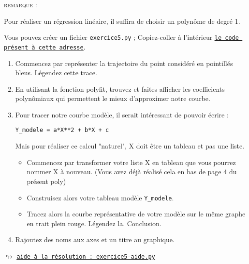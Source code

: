 \documentclass[11pt]{article}
\begin{document}
\medskip

\textsc{remarque : }

Pour réaliser un régression linéaire, il suffira de choisir un polynôme de degré 1.



\medskip


Vous pouvez créer un fichier \texttt{exercice5.py} ; Copiez-coller à l'intérieur \href{https://github.com/formationPythonPC-Juin/aides-formation/blob/master/exercice5-aide.py}{\underline{\texttt{le code présent à cette adresse}}}. 








\begin{enumerate}
\item Commencez par représenter la trajectoire du point considéré en pointillés bleus. Légendez cette trace.
\item En utilisant la fonction polyfit, trouvez et faites afficher les coefficients polynômiaux qui permettent le mieux d'approximer notre courbe.
\item Pour tracer notre courbe modèle, il serait intéressant de pouvoir écrire : 

\begin{center}
\texttt{Y\_modele = a*X**2 + b*X + c}                                     \end{center}
Mais pour réaliser ce calcul "naturel", X doit être un tableau et pas une liste. 

\begin{itemize}
 \item Commencez par transformer votre liste X en tableau que vous pourrez nommer X à nouveau. (Vous avez déjà réalisé cela en bas de page 4 du présent poly)
 \item Construisez alors votre tableau modèle \texttt{Y\_modele}.
 \item Tracez alors la courbe représentative de votre modèle sur le même graphe en trait plein rouge. Légendez la. Conclusion.
\end{itemize}
 \item Rajoutez des noms aux axes et un titre au graphique.



\end{enumerate}
 
 
 
 
 


\begin{center}
 $\looparrowright$ \href{https://github.com/formationPythonPC-Juin/aides-formation/blob/master/exercice5-aide.py}{\underline{\texttt{aide à la résolution : exercice5-aide.py}}}
\end{center}
\end{document}
